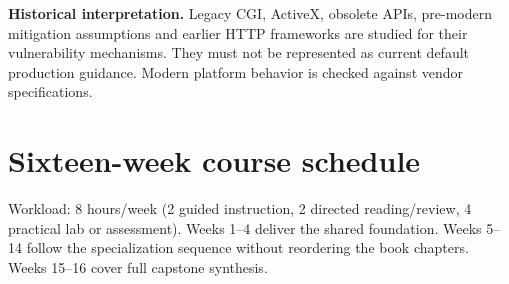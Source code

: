 \documentclass[10pt,letterpaper]{article}
\begin{document}
\begin{historynote}\textbf{Historical interpretation.} Legacy CGI, ActiveX, obsolete APIs, pre-modern mitigation assumptions and earlier HTTP frameworks are studied for their vulnerability mechanisms. They must not be represented as current default production guidance. Modern platform behavior is checked against vendor specifications.\end{historynote}
\section{Sixteen-week course schedule}
Workload: 8 hours/week (2 guided instruction, 2 directed reading/review, 4 practical lab or assessment). Weeks 1--4 deliver the shared foundation. Weeks 5--14 follow the specialization sequence without reordering the book chapters. Weeks 15--16 cover full capstone synthesis.
\end{document}
